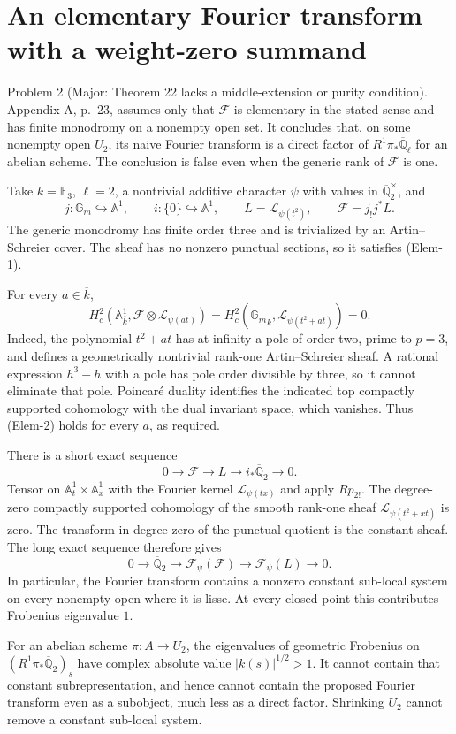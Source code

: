 \documentclass[10pt]{article}
\begin{document}
\section*{An elementary Fourier transform with a weight-zero summand}
Problem 2 (Major: Theorem 22 lacks a middle-extension or purity condition).  Appendix A, p. 23, assumes only that \(\mathcal F\) is elementary in the stated sense and has finite monodromy on a nonempty open set. It concludes that, on some nonempty open \(U_2\), its naive Fourier transform is a direct factor of \(R^1\pi_*\overline{\mathbb Q}_\ell\) for an abelian scheme. The conclusion is false even when the generic rank of \(\mathcal F\) is one.\par
Take \(k=\mathbb F_3\), \(\ell=2\), a nontrivial additive character \(\psi\) with values in \(\overline{\mathbb Q}_2^\times\), and \[j:\mathbb G_m\hookrightarrow\mathbb A^1,\qquad i:\{0\}\hookrightarrow\mathbb A^1,
 \qquad L=\mathcal L_{\psi(t^2)},\qquad \mathcal F=j_!j^*L.\] The generic monodromy has finite order three and is trivialized by an Artin–Schreier cover. The sheaf has no nonzero punctual sections, so it satisfies (Elem-1).\par
For every \(a\in\overline k\), \[H_c^2(\mathbb A^1_{\overline k},\mathcal F\otimes\mathcal L_{\psi(at)})
   =H_c^2({\mathbb G_m}_{\overline k},\mathcal L_{\psi(t^2+at)})=0.\] Indeed, the polynomial \(t^2+at\) has at infinity a pole of order two, prime to \(p=3\), and defines a geometrically nontrivial rank-one Artin–Schreier sheaf. A rational expression \(h^3-h\) with a pole has pole order divisible by three, so it cannot eliminate that pole. Poincaré duality identifies the indicated top compactly supported cohomology with the dual invariant space, which vanishes. Thus (Elem-2) holds for every \(a\), as required.\par
There is a short exact sequence \[0\longrightarrow\mathcal F\longrightarrow L
       \longrightarrow i_*\overline{\mathbb Q}_2\longrightarrow0.\] Tensor on \(\mathbb A^1_t\times\mathbb A^1_x\) with the Fourier kernel \(\mathcal L_{\psi(tx)}\) and apply \(Rp_{2!}\). The degree-zero compactly supported cohomology of the smooth rank-one sheaf \(\mathcal L_{\psi(t^2+xt)}\) is zero. The transform in degree zero of the punctual quotient is the constant sheaf. The long exact sequence therefore gives \[0\longrightarrow\overline{\mathbb Q}_2
    \longrightarrow \mathcal F_\psi(\mathcal F)
    \longrightarrow \mathcal F_\psi(L)\longrightarrow0.\] In particular, the Fourier transform contains a nonzero constant sub-local system on every nonempty open where it is lisse. At every closed point this contributes Frobenius eigenvalue \(1\).\par
For an abelian scheme \(\pi:A\to U_2\), the eigenvalues of geometric Frobenius on \((R^1\pi_*\overline{\mathbb Q}_2)_s\) have complex absolute value \(|k(s)|^{1/2}>1\). It cannot contain that constant subrepresentation, and hence cannot contain the proposed Fourier transform even as a subobject, much less as a direct factor. Shrinking \(U_2\) cannot remove a constant sub-local system.\par
\end{document}
